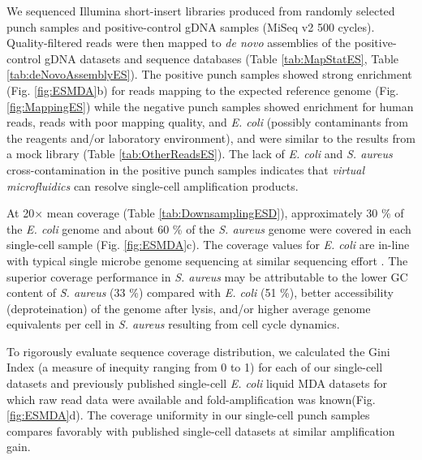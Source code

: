 We sequenced Illumina short-insert libraries produced from randomly selected punch samples and positive-control gDNA samples (MiSeq v2 500 cycles). Quality-filtered reads were then mapped to \textit{de novo} assemblies of the positive-control gDNA datasets and sequence databases (Table \ref{tab:MapStatES}, Table \ref{tab:deNovoAssemblyES}). The positive punch samples showed strong enrichment (Fig. \ref{fig:ESMDA}b) for reads mapping to the expected reference genome (Fig. \ref{fig:MappingES}) while the negative punch samples showed enrichment for human reads, reads with poor mapping quality, and \textit{E. coli} (possibly contaminants from the reagents and\slash or laboratory environment), and were similar to the results from a mock library (Table \ref{tab:OtherReadsES}). The lack of \textit{E. coli}  and \textit{S. aureus} cross-contamination in the positive punch samples indicates that \textit{virtual microfluidics} can resolve single-cell amplification products.

At 20$\times$ mean coverage (Table \ref{tab:DownsamplingESD}), approximately 30 \% of the \textit{E. coli}  genome and about 60 \% of the \textit{S. aureus}  genome were covered in each single-cell sample (Fig. \ref{fig:ESMDA}c). The coverage values for \textit{E. coli}  are in-line with typical single microbe genome sequencing at similar sequencing effort \cite{Woyke:2011eg,deBourcy:2014ji}. The superior coverage performance in \textit{S. aureus}  may be attributable to the lower GC content of \textit{S. aureus}  (33 \%) compared with \textit{E. coli}  (51 \%), better accessibility (deproteination) of the genome after lysis, and\slash or higher average genome equivalents per cell in \textit{S. aureus} resulting from cell cycle dynamics.

To rigorously evaluate sequence coverage distribution, we calculated the Gini Index (a measure of inequity ranging from 0 to 1) for each of our single-cell datasets and previously published single-cell \textit{E. coli} liquid MDA datasets for which raw read data were available and fold-amplification was known(Fig. \ref{fig:ESMDA}d). The coverage uniformity in our single-cell punch samples compares favorably with published single-cell datasets at similar amplification gain.

